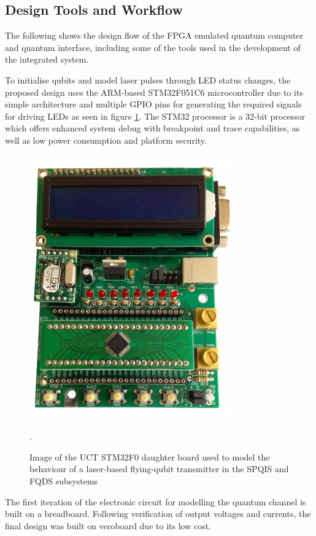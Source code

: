 \subsection{Design Tools and Workflow}

The following shows the design flow of the FPGA emulated quantum computer and quantum interface, including some of the tools used in the development of the integrated system.  

To initialise qubits and model laser pulses through LED status changes, the proposed design uses the ARM-based STM32F051C6 microcontroller due to its simple architecture and multiple GPIO pins for generating the required signals for driving LEDs as seen in figure \ref{fig:stm32-devboard}. The STM32 processor is a 32-bit processor which offers enhanced system debug with breakpoint and trace capabilities, as well as low power consumption and platform security. 
\begin{figure}[!ht]
	\centering
	\includegraphics[width=0.30\linewidth]{body/ch4/figs/stm32-devboard}
	\caption[Image of the UCT STM32F0 Development Board Used to Model the Behaviour of a Laser-Based Flying-Qubit Transmitter.]{Image of the UCT STM32F0 daughter board used to model the behaviour of a laser-based flying-qubit transmitter in the SPQIS and FQDS subsystems}.
	\label{fig:stm32-devboard}
\end{figure} 

The first iteration of the electronic circuit for modelling the quantum channel is built on a breadboard. Following verification of output voltages and currents, the final design was built on veroboard due to its low cost.

